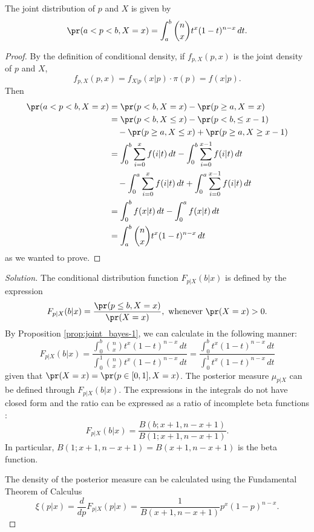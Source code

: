 \begin{proposition}
    \label{prop:joint_bayes-1}
    The joint distribution of $p$ and $X$ is given by
    \begin{equation*}
     \pr(a < p < b, X = x) = \int_{a}^{b} \binom{n}{x} t^x(1-t)^{n-x}\,dt.
    \end{equation*}
\end{proposition}

\begin{proof}
    By the definition of conditional density, if $f_{p,X}(p, x)$ is the
    joint density of $p$ and $X$, 
    $$
    f_{p,X}(p, x) = f_{X|p}(x|p)\cdot \pi(p) = f(x|p).$$  
    Then 
    \begin{equation*}
        \begin{split}
            \pr(a < p < b, X = x) &= \pr(p < b, X = x) - \pr(p \ge a, X = x) \\ 
            &= \pr(p < b, X \le x) - \pr(p < b, \le x - 1) \\
            &~~~- \pr(p \ge a, X \le x) + \pr(p \ge a, X \ge x -1) \\
            &= \int_0^b \sum_{i=0}^x f(i|t) \, dt - \int_0^b \sum_{i=0}^{x-1} f(i|t) \, dt \\ 
            &~~~-  
            \int_0^a \sum_{i=0}^x f(i|t) \, dt + \int_0^a \sum_{i=0}^{x-1} f(i|t) \, dt \\
            &= \int_0^b f(x|t)\, dt - \int_0^a f(x|t)\, dt \\
            &= \int_a^b \binom{n}{x} t^x(1 - t)^{n-x} \, dt
        \end{split}
    \end{equation*}
    as we wanted to prove. 
\end{proof}

\begin{proof}[Solution]
    The conditional distribution function $F_{p|X}(b|x)$ is defined by the expression
    $$
    F_{p|X}(b|x) = \frac{\pr(p \le b, X = x)}{\pr(X = x)}, \text{ whenever } \pr(X = x) > 0.
    $$
    By Proposition \ref{prop:joint_bayes-1}, we can calculate in the following
    manner:
    $$
    F_{p|X}(b|x) = \frac{\int_{0}^{b} \binom{n}{x} t^x(1-t)^{n-x}\,dt}{\int_{0}^{1} \binom{n}{x} t^x(1-t)^{n-x}\,dt} = \frac{\int_{0}^{b} t^x(1-t)^{n-x}\,dt}{\int_{0}^{1} t^x(1-t)^{n-x}\,dt}
    $$
    given that $\pr(X = x) = \pr(p \in [0,1], X = x)$. The posterior measure
    $\mu_{p|X}$ can be defined through $F_{p|X}(b|x)$. The expressions in the
    integrals do not have closed form and the ratio can be expressed as a
    ratio of incomplete beta functions \cite[]{beta}: 
    $$F_{p|X}(b|x) = \frac{B(b; x+1, n-x+1)}{B(1; x+1, n-x+1)}.$$
    In particular, $B(1;x+1,n-x+1) = B(x+1,n-x+1)$ is the beta function. 

    The density of the posterior measure can be calculated using the
    Fundamental Theorem of Calculus \cite[]{calculus}
    \begin{equation}
        \label{eq:posterior-1b}
        \xi(p|x) = \frac{d}{dp}F_{p|X}(p|x) = \frac{1}{B(x+1,n-x+1)}p^x(1 - p)^{n-x}.
    \end{equation}
\end{proof}